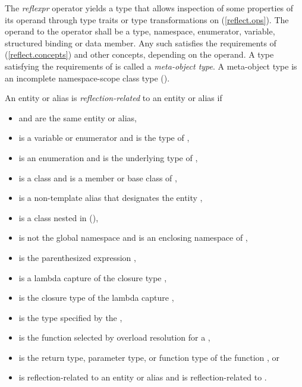 \begin{std.txt}\color{addclr}

    The \emph{reflexpr} operator yields a type  that allows inspection
    of some properties of its operand through type traits or type transformations
    on  (\ref{reflect.ops}).  The operand to the 
    operator shall be a type, namespace, enumerator, variable, structured
    binding or data member.  Any such  satisfies the requirements of
     (\ref{reflect.concepts}) and other 
    concepts, depending on the operand.  A type satisfying the requirements of
     is called a \emph{meta-object type}.  A meta-object
    type is an incomplete namespace-scope class type ().

    An entity or alias  is \emph{reflection-related} to an entity or
    alias  if

    \begin{itemize}
      \item {} and  are the same entity or alias,
      \item {} is a variable or enumerator and  is the type of ,
      \item {} is an enumeration and  is the underlying type of ,
      \item {} is a class and  is a member or base class of ,
      \item {} is a non-template alias that designates the entity ,
      \item {} is a class nested in  (),
      \item {} is not the global namespace and  is an enclosing namespace of ,
      \item {} is the parenthesized expression ,
      \item {} is a lambda capture of the closure type ,
      \item {} is the closure type of the lambda capture ,
      \item {} is the type specified by the  ,
      \item {} is the function selected by overload resolution for a  ,
      \item {} is the return type, parameter type, or function type of the function , or
      \item {} is reflection-related to an entity or alias  and  is reflection-related to .
    \end{itemize}


\end{std.txt}
